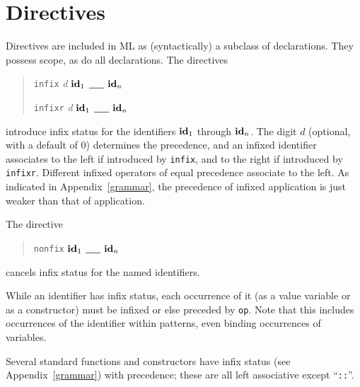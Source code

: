 \chapter{Directives}
Directives are included in ML as (syntactically) a subclass of declarations.
They possess scope, as do all declarations.  The directives
\begin{quote}
\verb"infix" {\it d} ${\bf id}_1$ \underline{\ \ \ } ${\bf id}_n$

\verb"infixr" {\it d} ${\bf id}_1$ \underline{\ \ \ } ${\bf id}_n$
\end{quote}
introduce infix status for the identifiers  ${\bf id}_1$  through ${\bf id}_n$.
The digit $d$ (optional, with a default of 0) determines the
precedence, and an infixed identifier associates to the left if
introduced by \verb"infix", and to the right if introduced by
\verb"infixr".  Different infixed operators of equal precedence
associate to the left.  As indicated in Appendix~\ref{grammar}, the precedence
of infixed application is just weaker than that of application.

The directive
\begin{quote}
\verb"nonfix" ${\bf id}_1$ \underline{\ \ \ } ${\bf id}_n$
\end{quote}
cancels infix status for the named identifiers.

While an identifier has infix status, each occurrence of it (as a
value variable or as a constructor) must be infixed or else preceded
by \verb"op".  Note that this includes occurrences of the identifier
within patterns, even binding occurrences of variables.

Several standard functions and constructors have infix status (see
Appendix~\ref{grammar}) with precedence; these are all left associative except
``\verb"::"''.
